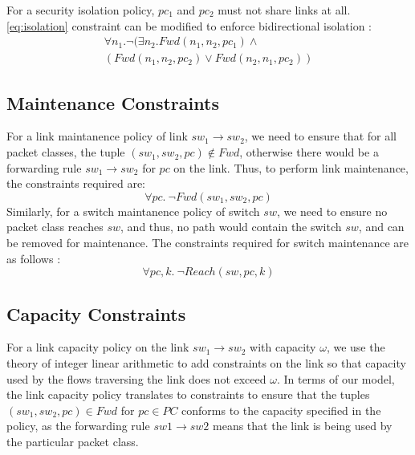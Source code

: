 For a security isolation policy, $pc_1$ and $pc_2$ must not share links at all. \cref{eq:isolation} constraint can be modified to enforce bidirectional isolation :
\begin{multline}
\forall n_1. \neg ( \exists n_2. Fwd(n_1,n_2,pc_1) \wedge \\ (Fwd(n_1,n_2,pc_2) \vee Fwd(n_2,n_1,pc_2)) \label{eq:secisolation}
\end{multline}

\subsection{Maintenance Constraints}
For a link maintanence policy of link $sw_1 \rightarrow sw_2$, we need to ensure that for all packet classes, the tuple $(sw_1, sw_2, pc) \notin Fwd$, otherwise there would be a forwarding rule $sw_1 \rightarrow sw_2$ for $pc$ on the link. Thus, to perform link maintenance, the constraints required are: 
\begin{equation}
	\forall pc. \ \neg Fwd(sw_1, sw_2, pc)
\end{equation}
Similarly, for a switch maintanence policy of switch $sw$, we need to ensure no packet class reaches $sw$, and thus, no path would contain the switch $sw$, and can be removed for maintenance. The constraints required for switch maintenance are as follows : 
\begin{equation}
	\forall pc, k. \ \neg Reach(sw, pc, k)  
\end{equation}

\subsection{Capacity Constraints}
For a link capacity policy on the link $sw_1 \rightarrow sw_2$ with capacity $\omega$, we use the theory of integer linear arithmetic to add constraints on the link so that capacity used by the flows traversing the link does not exceed $\omega$. In terms of our model, the link capacity policy translates to constraints to ensure that the tuples $(sw_1, sw_2, pc) \in Fwd$ for $pc \in PC$ conforms to the capacity specified in the policy, as the forwarding rule $sw1 \rightarrow sw2$ means that the link is being used by the particular packet class.
 
